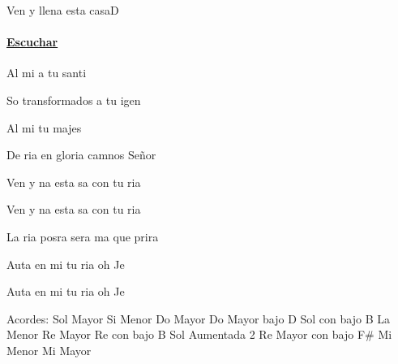 \documentclass[12pt, spanish]{book}
\begin{document}
    \begin{song}{Ven y llena esta casa}{D}
    {} %
    {}
    {} %
    {}
        \ifChordBk

        \paragraph{\mbox{}\hfill\protect\href{https://open.spotify.com/intl-es/track/2jDtBEyDiVdp7iGeu1N2QR}{Escuchar}\mbox{}\hfill}
        \fi


        \begin{SBOpGroup}
                 Al mi a tu santi

             So transformados a tu igen

            Al mi tu majes

             De ria en gloria camnos Señor
        \end{SBOpGroup}

        \begin{SBChorus}
              Ven y na esta   sa con tu ria

              Ven y na esta   sa con tu ria

             La ria posra sera ma que      prira

            Auta en mi tu ria oh Je

            Auta en mi tu ria oh Je
        \end{SBChorus}

        \ifChordBk
        \begin{SBOpGroup}
            Acordes:\break
            \upchord{\G}\qquad Sol Mayor \hfill
            \upchord{\Bm}\qquad Si Menor \hfill\null\break
            \upchord{\C}\qquad Do Mayor \hfill
            \upchord{\CD}\qquad Do Mayor bajo D \hfill\null\break
            \upchord{\GB}\qquad\qquad Sol con bajo B \hfill
            \upchord{\Am}\qquad La Menor \hfill\null\break
            \upchord{\D}\qquad Re Mayor \hfill
            \upchord{\DB}\qquad\qquad Re con bajo B \hfill\null\break
            \upchord{\Gtwo}\qquad Sol Aumentada 2 \hfill
            \upchord{\DFs}\qquad Re Mayor con bajo F\# \hfill\null\break
            \upchord{\Em}\qquad Mi Menor \hfill
            \upchord{\E}\qquad Mi Mayor \hfill\null\break
        \end{SBOpGroup}
        \fi
    \end{song}
\end{document}
